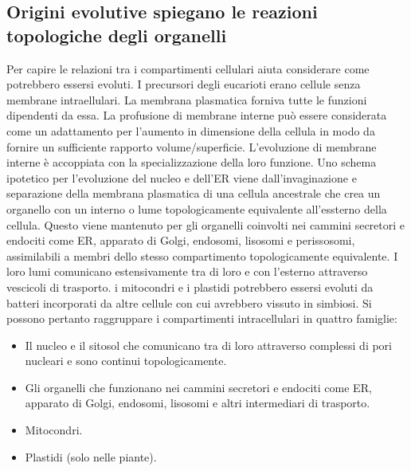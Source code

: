 \subsection{Origini evolutive spiegano le reazioni topologiche degli organelli}
Per capire le relazioni tra i compartimenti cellulari aiuta considerare come potrebbero essersi evoluti. I precursori degli eucarioti erano cellule senza membrane intraellulari. La
membrana plasmatica forniva tutte le funzioni dipendenti da essa. La profusione di membrane interne pu\`o essere considerata come un adattamento per l'aumento in dimensione della
cellula in modo da fornire un sufficiente rapporto volume/superficie. L'evoluzione di membrane interne \`e accoppiata con la specializzazione della loro funzione. Uno schema ipotetico
per l'evoluzione del nucleo e dell'ER viene dall'invaginazione e separazione della membrana plasmatica di una cellula ancestrale che crea un organello con un interno o lume 
topologicamente equivalente all'essterno della cellula. Questo viene mantenuto per gli organelli coinvolti nei cammini secretori e endociti come ER, apparato di Golgi, endosomi, 
lisosomi e perissosomi, assimilabili a membri dello stesso compartimento topologicamente equivalente. I loro lumi comunicano estensivamente tra di loro e con l'esterno attraverso
vescicoli di trasporto. i mitocondri e i plastidi potrebbero essersi evoluti da batteri incorporati da altre cellule con cui avrebbero vissuto in simbiosi. Si possono pertanto 
raggruppare i compartimenti intracellulari in quattro famiglie:
\begin{itemize}
	\item Il nucleo e il sitosol che comunicano tra di loro attraverso complessi di pori nucleari e sono continui topologicamente.
	\item Gli organelli che funzionano nei cammini secretori e endociti come ER, apparato di Golgi, endosomi, lisosomi e altri intermediari di trasporto.
	\item Mitocondri.
	\item Plastidi (solo nelle piante).
\end{itemize}
